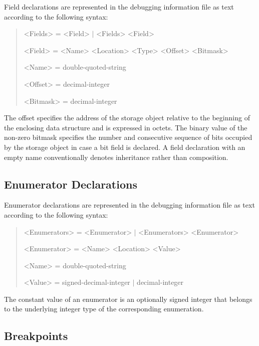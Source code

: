 Field declarations are represented in the debugging information file as text according to the following syntax:

\begin{quote}\begin{grammar}
<Fields> = <Field> $\mid$ <Fields> <Field> \par
<Field> = <Name> <Location> <Type> <Offset> <Bitmask> \par
<Name> = double-quoted-string \par
<Offset> = decimal-integer \par
<Bitmask> = decimal-integer \par
\end{grammar}\end{quote}

The offset specifies the address of the storage object relative to the beginning of the enclosing data structure and is expressed in octets.
The binary value of the non-zero bitmask specifies the number and consecutive sequence of bits occupied by the storage object in case a bit field is declared.
A field declaration with an empty name conventionally denotes inheritance rather than composition.

\subsection{Enumerator Declarations}

Enumerator declarations are represented in the debugging information file as text according to the following syntax:

\begin{quote}\begin{grammar}
<Enumerators> = <Enumerator> $\mid$ <Enumerators> <Enumerator> \par
<Enumerator> = <Name> <Location> <Value> \par
<Name> = double-quoted-string \par
<Value> = signed-decimal-integer $\mid$ decimal-integer \par
\end{grammar}\end{quote}

The constant value of an enumerator is an optionally signed integer that belongs to the underlying integer type of the corresponding enumeration.

\subsection{Breakpoints}

